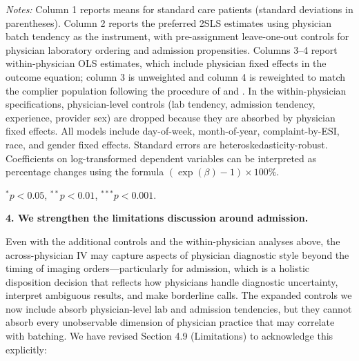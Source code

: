 \documentclass[11pt]{article}
\newcommand{\1}{\hbox{\rm 1\kern-.35em 1}}
\begin{document}
\begin{table}[t!]
\begin{threeparttable}
\begin{flushleft}
\textit{Notes:} Column 1 reports means for standard care patients (standard deviations in parentheses). Column 2 reports the preferred 2SLS estimates using physician batch tendency as the instrument, with pre-assignment leave-one-out controls for physician laboratory ordering and admission propensities. Columns 3--4 report within-physician OLS estimates, which include physician fixed effects in the outcome equation; column 3 is unweighted and column 4 is reweighted to match the complier population following the procedure of \citet{bhuller2020incarceration} and \citet{dobbie2018effects}. In the within-physician specifications, physician-level controls (lab tendency, admission tendency, experience, provider sex) are dropped because they are absorbed by physician fixed effects. All models include day-of-week, month-of-year, complaint-by-ESI, race, and gender fixed effects. Standard errors are heteroskedasticity-robust. Coefficients on log-transformed dependent variables can be interpreted as percentage changes using the formula $(\exp(\beta) - 1) \times 100\%$.
\item $^{*} p < 0.05$, $^{**} p < 0.01$, $^{***} p < 0.001$.
\end{flushleft}
\end{threeparttable}
\end{table}

\textbf{4. We strengthen the limitations discussion around admission.}

Even with the additional controls and the within-physician analyses above, the across-physician IV may capture aspects of physician diagnostic style beyond the timing of imaging orders---particularly for admission, which is a holistic disposition decision that reflects how physicians handle diagnostic uncertainty, interpret ambiguous results, and make borderline calls. The expanded controls we now include absorb physician-level lab and admission tendencies, but they cannot absorb every unobservable dimension of physician practice that may correlate with batching. We have revised Section 4.9 (Limitations) to acknowledge this explicitly:
\end{document}
